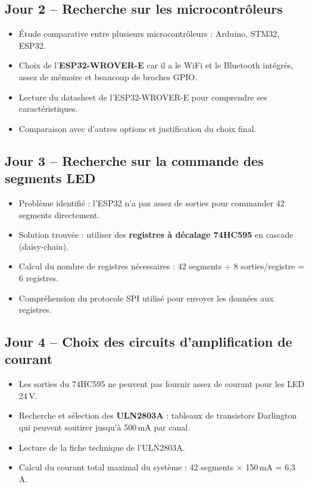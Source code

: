 \documentclass[12pt,a4paper]{article}
\begin{document}
\subsection*{Jour 2 -- Recherche sur les microcontrôleurs}
\begin{itemize}
    \item Étude comparative entre plusieurs microcontrôleurs : Arduino, STM32, ESP32.
    \item Choix de l'\textbf{ESP32-WROVER-E} car il a le WiFi et le Bluetooth intégrés, assez de mémoire et beaucoup de broches GPIO.
    \item Lecture du datasheet de l'ESP32-WROVER-E pour comprendre ses caractéristiques.
    \item Comparaison avec d'autres options et justification du choix final.
\end{itemize}

\subsection*{Jour 3 -- Recherche sur la commande des segments LED}
\begin{itemize}
    \item Problème identifié : l'ESP32 n'a pas assez de sorties pour commander 42 segments directement.
    \item Solution trouvée : utiliser des \textbf{registres à décalage 74HC595} en cascade (daisy-chain).
    \item Calcul du nombre de registres nécessaires : 42 segments $\div$ 8 sorties/registre = 6 registres.
    \item Compréhension du protocole SPI utilisé pour envoyer les données aux registres.
\end{itemize}

\subsection*{Jour 4 -- Choix des circuits d'amplification de courant}
\begin{itemize}
    \item Les sorties du 74HC595 ne peuvent pas fournir assez de courant pour les LED 24\,V.
    \item Recherche et sélection des \textbf{ULN2803A} : tableaux de transistors Darlington qui peuvent soutirer jusqu'à 500\,mA par canal.
    \item Lecture de la fiche technique de l'ULN2803A.
    \item Calcul du courant total maximal du système : 42 segments × 150\,mA = 6,3\,A.
\end{itemize}
\end{document}
